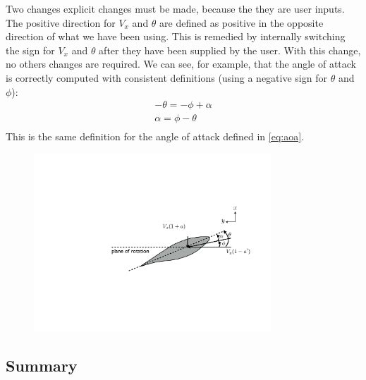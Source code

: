 \documentclass{article}
\begin{document}
Two changes explicit changes must be made, because the they are user inputs.   The positive direction for $V_x$ and $\theta$ are defined as positive in the opposite direction of what we have been using.  This is remedied by internally switching the sign for $V_x$ and $\theta$ after they have been supplied by the user.  With this change, no others changes are required.  We can see, for example, that the angle of attack is correctly computed with consistent definitions (using a negative sign for $\theta$ and $\phi$):
\begin{equation}
    \begin{aligned}
        -\theta = -\phi + \alpha\\
        \alpha = \phi - \theta\\
    \end{aligned}
\end{equation}
This is the same definition for the angle of attack defined in \cref{eq:aoa}.


\begin{figure}[htbp]
\centering
\includegraphics[width=3.5in]{figures/inflowprop}
\caption{}
\label{fig:inflowprop}
\end{figure}

\subsection{Summary}
\end{document}

